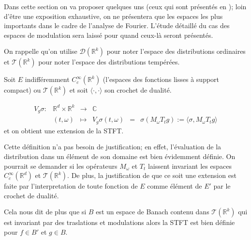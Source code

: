 	Dans cette section on va proposer quelques uns (ceux qui sont présentés en \cite{Grochenig}); loin d'être une exposition exhaustive, on ne présentera que les espaces les plus importants dans le cadre de l'analyse de Fourier. L'étude détaillé du cas des espaces de modulation sera laissé pour quand ceux-là seront présentés.

	On rappelle qu'on utilise $\mathscr{D} (\mathbb{R}^k)$ pour noter l'espace des distributions ordinaires et $\mathscr{T} (\mathbb{R}^k)$ pour noter l'espace des distributions tempérées.

	\begin{definition}
	Soit $E$ indifféremment $C^{\infty}_{c} (\mathbb{R}^{k})$ (l'espaces des fonctions lisses à support compact) ou $\mathscr{T} (\mathbb{R}^k)$ et soit $\langle \cdot , \cdot \rangle$ son crochet de dualité.

	$$
	\begin{matrix}
	V_{g}\sigma : & \mathbb{R}^d \times \mathbb{R}^k & \rightarrow & \mathbb{C} \\
	& (t,\omega) & \mapsto & V_{g}\sigma (t, \omega) &=& \sigma(M_{\omega}T_{t}g) := \langle \sigma, M_{\omega}T_{t}g \rangle 
	\end{matrix}
	$$
	et on obtient une extension de la STFT.
	\end{definition}

	Cette définition n'a pas besoin de justification; en effet, l'évaluation de la distribution dans un élément de son domaine est bien évidemment définie. On pourrait se demander si les opérateurs $M_{\omega}$ et $T_{t}$ laissent invariant les espaces $C^{\infty}_{c}(\mathbb{R}^{d})$ et $\mathscr{T} (\mathbb{R}^k)$. De plus, la justification de que ce soit une extension est faite par l'interpretation de toute fonction de $E$ comme élément de $E'$ par le crochet de dualité.

	Cela nous dit de plus que si $B$ est un espace de Banach contenu dans $\mathscr{T} (\mathbb{R}^k)$ qui est invariant par des traslations et modulations alors la STFT est bien définie pour $f\in B'$ et $g\in B$.